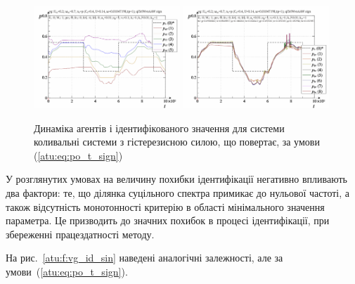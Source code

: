 \begin{figure}[ht!]
\begin{center}
  \includegraphics[width=0.49\textwidth]{p/cha/vg/vg_id-p_t_pi_ql3rlWvnAAW_sign.png}
  \hfill
  \includegraphics[width=0.49\textwidth]{p/cha/vg/vg_id-p_t_p_ql3rlWvnAAW_sign.png}
\end{center}
\caption{Динаміка агентів і ідентифікованого значення для системи коливальні системи з гістерезисною силою, що повертає, за умови (\ref{atu:eq:po_t_sign})}
\label{atu:f:vg_id_sign}
\end{figure}

У розглянутих умовах на величину похибки ідентифікації
негативно впливають два фактори: те, що ділянка суцільного спектра примикає до нульової частоті,
а також відсутність монотонності
критерію в області мінімального значення параметра. Це
призводить до значних похибок в процесі ідентифікації, при
збереженні працездатності методу.


На рис.~\ref{atu:f:vg_id_sin} наведені аналогічні залежності, але за
умови~(\ref{atu:eq:po_t_sign}).

